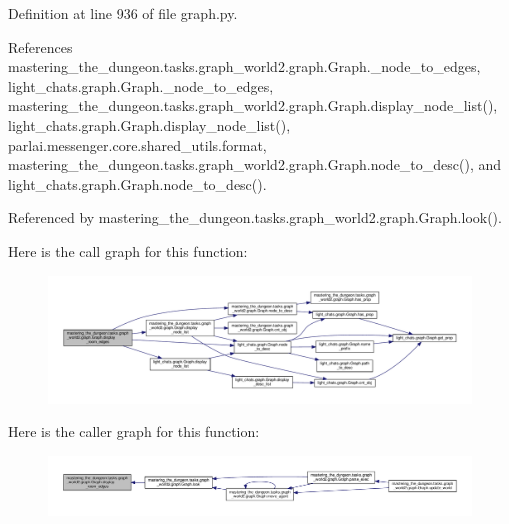 Definition at line 936 of file graph.\+py.



References mastering\+\_\+the\+\_\+dungeon.\+tasks.\+graph\+\_\+world2.\+graph.\+Graph.\+\_\+node\+\_\+to\+\_\+edges, light\+\_\+chats.\+graph.\+Graph.\+\_\+node\+\_\+to\+\_\+edges, mastering\+\_\+the\+\_\+dungeon.\+tasks.\+graph\+\_\+world2.\+graph.\+Graph.\+display\+\_\+node\+\_\+list(), light\+\_\+chats.\+graph.\+Graph.\+display\+\_\+node\+\_\+list(), parlai.\+messenger.\+core.\+shared\+\_\+utils.\+format, mastering\+\_\+the\+\_\+dungeon.\+tasks.\+graph\+\_\+world2.\+graph.\+Graph.\+node\+\_\+to\+\_\+desc(), and light\+\_\+chats.\+graph.\+Graph.\+node\+\_\+to\+\_\+desc().



Referenced by mastering\+\_\+the\+\_\+dungeon.\+tasks.\+graph\+\_\+world2.\+graph.\+Graph.\+look().

Here is the call graph for this function\+:
\nopagebreak
\begin{figure}[H]
\begin{center}
\leavevmode
\includegraphics[width=350pt]{classmastering__the__dungeon_1_1tasks_1_1graph__world2_1_1graph_1_1Graph_ac0e5e4ffa325ec4c63f0f26d055c2e23_cgraph}
\end{center}
\end{figure}
Here is the caller graph for this function\+:
\nopagebreak
\begin{figure}[H]
\begin{center}
\leavevmode
\includegraphics[width=350pt]{classmastering__the__dungeon_1_1tasks_1_1graph__world2_1_1graph_1_1Graph_ac0e5e4ffa325ec4c63f0f26d055c2e23_icgraph}
\end{center}
\end{figure}
\mbox{\label{classmastering__the__dungeon_1_1tasks_1_1graph__world2_1_1graph_1_1Graph_a1b95c16880df744d95de3fd1213f912f}} 
